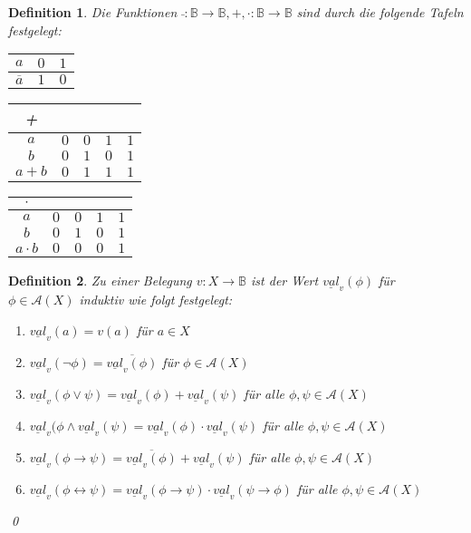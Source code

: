 \documentclass[ngerman]{scrartcl}
\theoremstyle{custom}
\newtheorem{mdef}{Definition} \numberwithin{mdef}{subsection}
\newcommand{\ax}{\mathcal{A}(X)}
\newcommand{\val}{\underline{val}_v}
\newcommand{\0}{\mathbf{0}}
\newcommand{\1}{\mathbf{L}}
\begin{document}
\begin{mdef} Die Funktionen $\bar{ }: \mathds{B} \rightarrow
  \mathds{B}, +, \cdot: \mathds{B} \rightarrow \mathds{B}$ sind durch
  die folgende Tafeln festgelegt:\\
\begin{tabular}{c|cc}
$a$ & $0$ & $1$ \\
\hline $\overline{a}$ & $1$ & $0$
\end{tabular}
\begin{tabular}{c|cccc}
+ & & & & \\
\hline $a$ & $0$ & $0$ & $1$ & $1$ \\
$b$ & $0$ & $1$ & $0$ & $1$\\
$a+b$ & $0$ & $1$ & $1$ & $1$ \\
\end{tabular}
\begin{tabular}{c|cccc}
$\cdot$ & & & & \\
\hline $a$ & $0$ & $0$ & $1$ & $1$ \\
$b$ & $0$ & $1$ & $0$ & $1$\\
$a \cdot b$ & $0$ & $0$ & $0$ & $1$ \\
\end{tabular}
\end{mdef}

\begin{mdef} Zu einer Belegung $v: X \rightarrow \mathds{B}$ ist der
  Wert $\underline{val}_v(\phi)$ f\"ur $\phi \in \ax$ induktiv wie
  folgt festgelegt:
\begin{enumerate}
\item $\val(a) = v(a)$ f\"ur $a \in X$
\item $\val(\neg \phi) = \overline{\val(\phi)}$ f\"ur $\phi \in \ax$
\item $\val(\phi \vee \psi) = \val(\phi) + \val(\psi)$ f\"ur alle $\phi,
  \psi \in \ax$
\item $\val(\phi \wedge \val(\psi) = \val(\phi) \cdot \val(\psi)$
  f\"ur alle $\phi, \psi \in \ax$
\item $\val(\phi \rightarrow \psi) = \overline{\val(\phi)} +
  \val(\psi)$ f\"ur alle $\phi, \psi \in \ax$
\item $\val(\phi \leftrightarrow \psi) = \val(\phi \rightarrow \psi) \cdot
  \val(\psi \rightarrow \phi)$ f\"ur alle $\phi, \psi \in \ax$
\end{enumerate}
\qed
\end{mdef}
\end{document}
